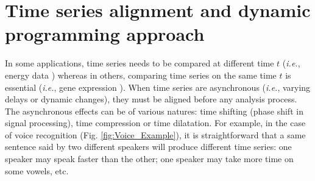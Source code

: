 \section{Time series alignment and dynamic programming approach}

In some applications, time series needs to be compared at different time $t$ (\textit{i.e.}, energy data \cite{Najmeddine2012}) whereas in others, comparing time series on the same time $t$ is essential (\textit{i.e.}, gene expression \cite{Chouakria2007}). When time series are asynchronous (\textit{i.e.}, varying delays or dynamic changes), they must be aligned before any analysis process. The asynchronous effects can be of various natures: time shifting (phase shift in signal processing), time compression or time dilatation. For example, in the case of voice recognition (Fig. \ref{fig:Voice_Example}), it is straightforward that a same sentence said by two different speakers will produce different time series: one speaker may speak faster than the other; one speaker may take more time on some vowels, etc.

